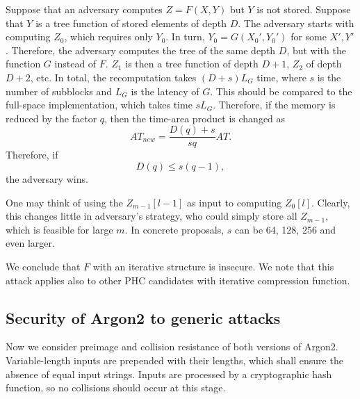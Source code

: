 \documentclass[a4paper]{article}
\begin{document}
Suppose that an adversary computes $Z = F(X,Y)$ but $Y$ is not stored. Suppose that  $Y$ is a tree function of stored elements of depth $D$.  The adversary starts with computing $Z_0$, which requires only $Y_0$. In turn, $Y_0 = G(X_0', Y_0')$ for some $X',Y'$.
Therefore, the adversary computes the tree of the same depth $D$, but with the function $G$ instead of $F$. $Z_1$ is then a tree function of depth $D+1$, $Z_2$ of depth $D+2$, etc. In total, the recomputation takes $(D+s)L_G$ time, where $s$ is the number of subblocks and $L_G$ is the latency of $G$. This should be compared to the full-space implementation, which takes time
$sL_G$. Therefore, if the memory is reduced by the factor $q$, then the time-area product is changed as
$$
AT_{new} = \frac{D(q)+s}{sq}AT.
$$
Therefore, if
\begin{equation}\label{att:iter}
D(q) \leq s(q-1),
\end{equation}
the adversary wins.

One may think of using the $Z_{m-1}[l-1]$ as input to computing $Z_0[l]$. Clearly, this changes little in adversary's strategy, who could simply store all $Z_{m-1}$, which is feasible for large $m$. In concrete proposals, $s$ can be 64, 128, 256 and even larger.

We conclude that $F$ with an iterative structure is insecure. We note that this attack applies also to other PHC candidates with iterative compression function.


\subsection{Security of Argon2 to generic attacks}\label{sec:generic}

Now we consider preimage and collision resistance of both versions of \textsf{Argon2}. Variable-length inputs are prepended with their lengths, which shall ensure
 the absence of equal input strings. Inputs are processed by a cryptographic hash function, so no collisions should occur at this stage.
 
\end{document}
